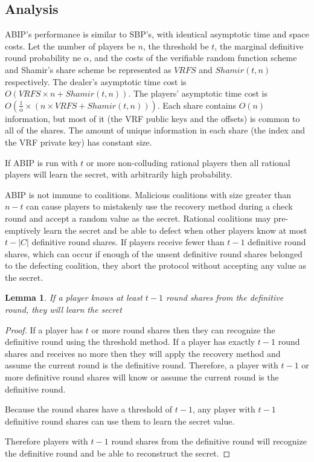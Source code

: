 \documentclass{dalcsthesis}
\newtheorem{lemma}{Lemma}
\begin{document}
\subsection{Analysis}

ABIP's performance is similar to SBP's, with identical asymptotic time and space costs. Let the number of players be $n$, the threshold be $t$, the marginal definitive round probability ne $\alpha$, and the costs of the verifiable random function scheme and Shamir's share scheme be represented as $VRFS$ and $Shamir(t, n)$ respectively. The dealer's asymptotic time cost is $O(VRFS \times n + Shamir(t, n))$. The players' asymptotic time cost is $O(\frac{1}{\alpha} \times (n \times VRFS + Shamir(t, n)))$. Each share contains $O(n)$ information, but most of it (the VRF public keys and the offsets) is common to all of the shares. The amount of unique information in each share (the index and the VRF private key) has constant size.

If ABIP is run with $t$ or more non-colluding rational players then all rational players will learn the secret, with arbitrarily high probability.

ABIP is not immune to coalitions. Malicious coalitions with size greater than $n-t$ can cause players to mistakenly use the recovery method during a check round and accept a random value as the secret. Rational coalitions may pre-emptively learn the secret and be able to defect when other players know at most $t-|C|$ definitive round shares. If players receive fewer than $t-1$ definitive round shares, which can occur if enough of the unsent definitive round shares belonged to the defecting coalition, they abort the protocol without accepting any value as the secret.

\begin{lemma} If a player knows at least $t-1$ round shares from the definitive round, they will learn the secret \end{lemma}
\begin{proof}
If a player has $t$ or more round shares then they can recognize the definitive round using the threshold method. If a player has exactly $t-1$ round shares and receives no more then they will apply the recovery method and assume the current round is the definitive round.  Therefore, a player with $t-1$ or more definitive round shares will know or assume the current round is the definitive round.

Because the round shares have a threshold of $t-1$, any player with $t-1$ definitive round shares can use them to learn the secret value.

Therefore players with $t-1$ round shares from the definitive round will recognize the definitive round and be able to reconstruct the secret.
\end{proof}
\end{document}
